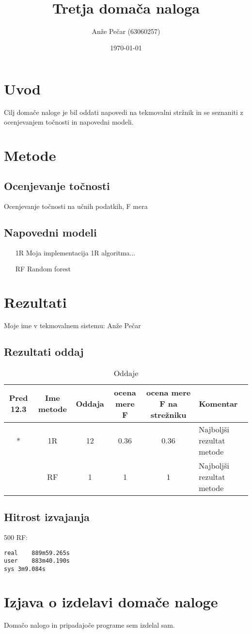 \documentclass[a4paper,11pt]{article}
\title{Tretja domača naloga}
\author{Anže Pečar (63060257)}
\date{\today}
\begin{document}
\maketitle

\section{Uvod}

Cilj domače naloge je bil oddati napovedi na tekmovalni stržnik in se seznaniti z ocenjevanjem točnosti in napovedni modeli.

\section{Metode}
\subsection{Ocenjevanje točnosti}
Ocenjevanje točnosti na učnih podatkih, F mera
\subsection{Napovedni modeli}
\begin{itemize}
\item[1R] Moja implementacija 1R algoritma...
\item[RF] Random forest
\end{itemize}
\section{Rezultati}
Moje ime v tekmovalnem sistemu: Anže Pečar
\subsection{Rezultati oddaj}
\begin{table}[H]
\caption{Oddaje}
\begin{tabular}{ c c c c c l }
 Pred 12.3 & Ime metode & Oddaja & ocena mere F & ocena mere F na strežniku & Komentar\\
  \hline
  * & 1R & 12 & 0.36 & 0.36 & Najboljši rezultat metode \\
  \* & RF & 1 & 1 & 1 & Najboljši rezultat metode \\
 \end{tabular}
\end{table}

\subsection{Hitrost izvajanja}
500 RF:
\begin{verbatim}
real	889m59.265s
user	883m40.190s
sys	3m9.084s
\end{verbatim}

\section{Izjava o izdelavi domače naloge}
Domačo nalogo in pripadajoče programe sem izdelal sam.
\end{document}
